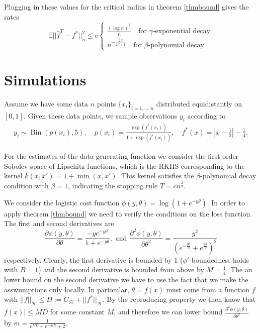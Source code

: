 Plugging in these values for the critical radius in theorem \ref{thmbound} gives the rates
\begin{equation*}
\mathbb{E}||\bar{f}^T-f^*||_n^2 \le c\begin{cases}
\frac{(\log n)^{\frac{1}{\gamma}}}{n} \quad\text{for $\gamma$-exponential decay}\\
n^{-\frac{2\beta}{2\beta + 1}} \quad\text{for $\beta$-polynomial decay}
\end{cases}
\end{equation*}
\section{Simulations}
Assume we have some data $n$ points $\{x_i\}_{i=1,...,n}$ distributed equidistantly on $[0,1]$. Given these data points, we sample observations $y_i$ according to
\begin{align*}
y_i \sim \operatorname{Bin}(p(x_i), 5), \quad
p(x_i)=\frac{\exp(f^*(x_i))}{1+\exp(f^*(x_i))}, \quad f^*(x) = |x-\frac{1}{2}| - \frac{1}{4}.
\end{align*}

For the estimates of the data-generating function we consider the first-order Sobolev space of Lipschitz functions, which is the RKHS corresponding to the kernel $k(x,x') = 1 + \min(x,x')$. This kernel satisfies the $\beta$-polynomial decay condition with $\beta=1$, indicating the stopping rule $T=cn^{\frac{2}{3}}$.

We consider the logistic cost function $\phi(y,\theta)=\log(1+e^{-y\theta})$. In order to apply theorem \ref{thmbound} we need to verify the conditions on the loss function. The first and second derivatives are
\begin{equation*}
\frac{\partial\phi(y,\theta)}{\partial\theta} = \frac{-ye^{-y\theta}}{1+e^{-y\theta}}, \text{ and } \frac{\partial^2\phi(y,\theta)}{\partial\theta^2} = \frac{y^2}{(e^{-\frac{y\theta}{2}}+e^{\frac{y\theta}{2}})^2}
\end{equation*}
respectively. Clearly, the first derivative is bounded by 1 ($\phi'$-boundedness holds with $B=1$) and the second derivative is bounded from above by $M=\frac{1}{4}$. The an lower bound on the second derivative we have to use the fact that we make the asswumptions only locally. In particular, $\theta=f(x)$ must come from a function $f$ with $||f||_{\mathcal{H}}\le D := C_{\mathcal{H}} + ||f^*||_{\mathcal{H}}$. By the reproducing property we then know that $f(x)|\le MD$ for some constant $M$, and therefore we can lower bound $\frac{\partial^2\phi(y,\theta)}{\partial\theta^2}$ by $m=\frac{1}{e^{MD}+e^{-MD}+2}$.

